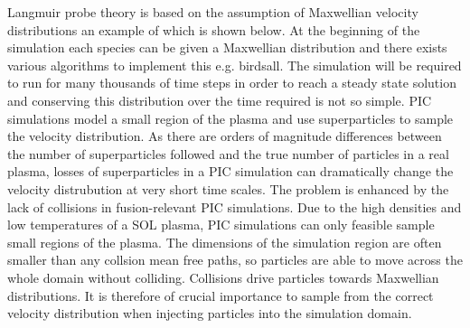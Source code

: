 Langmuir probe theory is based on the assumption of Maxwellian velocity distributions an example of which is shown below. At the beginning of the simulation each species can be given a Maxwellian distribution and there exists various algorithms to implement this e.g. birdsall. The simulation will be required to run for many thousands of time steps in order to reach a steady state solution and conserving this distribution over the time required is not so simple. PIC simulations model a small region of the plasma and use superparticles to sample the velocity distribution. As there are orders of magnitude differences between the number of superparticles followed and the true number of particles in a real plasma, losses of superparticles in a PIC simulation can dramatically change the velocity distrubution at very short time scales. The problem is enhanced by the lack of collisions in fusion-relevant PIC simulations. Due to the high densities and low temperatures of a SOL plasma, PIC simulations can only feasible sample small regions of the plasma. The dimensions of the simulation region are often smaller than any collsion mean free paths, so particles are able to move across the whole domain without colliding. Collisions drive particles towards Maxwellian distributions. It is therefore of crucial importance to sample from the correct velocity distribution when injecting particles into the simulation domain. 
